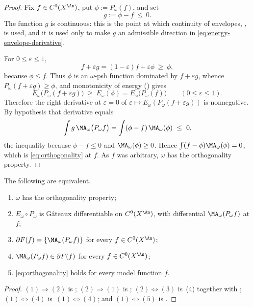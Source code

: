 \begin{proof}
Fix $f\in C^0(X^{\An})$, put $\phi:=P_\omega(f)$, and set
\[
 g:=\phi-f\ \leq\ 0 .
\]
The function $g$ is continuous: this is the point at which continuity of
envelopes, , is used, and it is used only
to make $g$ an admissible direction in
\eqref{eq:energy-envelope-derivative}.

For $0\leq\varepsilon\leq1$,
\[
 f+\varepsilon g=(1-\varepsilon)f+\varepsilon\phi\ \geq\ \phi ,
\]
because $\phi\leq f$.  Thus $\phi$ is an $\omega$-psh function
dominated by $f+\varepsilon g$, whence
$P_\omega(f+\varepsilon g)\geq\phi$, and monotonicity of energy
() gives
\[
 E_\omega\bigl(P_\omega(f+\varepsilon g)\bigr)\ \geq\ E_\omega(\phi)
 =E_\omega\bigl(P_\omega(f)\bigr)
 \qquad(0\leq\varepsilon\leq1).
\]
Therefore the right derivative at $\varepsilon=0$ of
$\varepsilon\mapsto E_\omega(P_\omega(f+\varepsilon g))$ is nonnegative.
By hypothesis that derivative equals
\[
 \int g\,\MA_\omega\bigl(P_\omega f\bigr)
 =\int(\phi-f)\,\MA_\omega(\phi)\ \leq\ 0,
\]
the inequality because $\phi-f\leq0$ and $\MA_\omega(\phi)\geq0$.  Hence
$\int(f-\phi)\MA_\omega(\phi)=0$, which is
\eqref{eq:orthogonality} at $f$.  As $f$ was arbitrary, $\omega$ has
the orthogonality property.
\end{proof}

\begin{corollary}
\label{cor:ch27-orthogonality-iff-differentiability}
The following are equivalent.
\begin{enumerate}
\item $\omega$ has the orthogonality property;
\item $E_\omega\circ P_\omega$ is G\^ateaux differentiable on
$C^0(X^{\An})$, with differential $\MA_\omega(P_\omega f)$ at $f$;
\item $\partial F(f)=\{\MA_\omega(P_\omega f)\}$ for every
$f\in C^0(X^{\An})$;
\item $\MA_\omega(P_\omega f)\in\partial F(f)$ for every
$f\in C^0(X^{\An})$;
\item \eqref{eq:orthogonality} holds for every model function $f$.
\end{enumerate}
\end{corollary}

\begin{proof}
$(1)\Rightarrow(2)$ is
;
$(2)\Rightarrow(1)$ is
;
$(2)\Leftrightarrow(3)$ is
\,(4) together with
; $(1)\Leftrightarrow(4)$ is
\,$(1)\Leftrightarrow(4)$;
and $(1)\Leftrightarrow(5)$ is
.
\end{proof}

